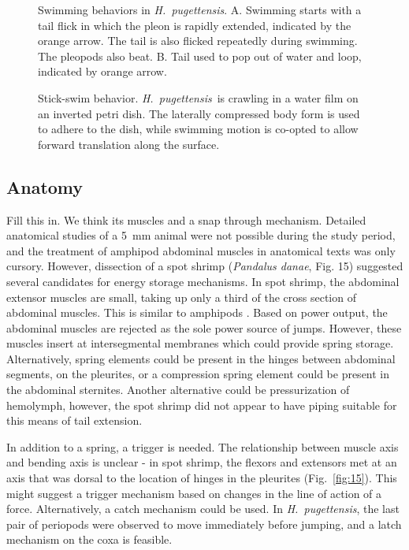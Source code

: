 \documentclass{article}
\newcommand{\Genus}[1]{\emph{#1}}
\newcommand{\Hyale}{\Genus{H.~pugettensis}}
\begin{document}
\begin{figure}
\caption{Swimming behaviors in \Hyale.  A.  Swimming starts with a tail flick in which the pleon is rapidly extended, indicated by the orange arrow.  The tail is also flicked repeatedly during swimming.  The pleopods also beat.  B.  Tail used to pop out of water and loop, indicated by orange arrow.}
\label{fig:19}
\end{figure}

\begin{figure}
\caption{Stick-swim behavior.  \Hyale\ is crawling in a water film on an inverted petri dish.  The laterally compressed body form is used to adhere to the dish, while swimming motion is co-opted to allow forward translation along the surface. }
\label{fig:20}
\end{figure}


\subsection*{Anatomy}
Fill this in.  We think its muscles and a snap through mechanism. Detailed anatomical studies of a \SI{5}{\milli\meter} animal were not possible during the study period, and the treatment of amphipod abdominal muscles in anatomical texts \citep{Schmitz:1991} was only cursory.  However, dissection of a spot shrimp (\Genus{Pandalus danae}, Fig. 15) suggested several candidates for energy storage mechanisms.  In spot shrimp, the abdominal extensor muscles are small, taking up only a third of the cross section of abdominal muscles.  This is similar to amphipods \citep{Schmitz:1991}.  Based on power output, the abdominal muscles are rejected as the sole power source of jumps.  However, these muscles insert at intersegmental membranes which could provide spring storage.  Alternatively, spring elements could be present in the hinges between abdominal segments, on the pleurites, or a compression spring element could be present in the abdominal sternites.  Another alternative could be pressurization of hemolymph, however, the spot shrimp did not appear to have piping suitable for this means of tail extension. 
	
In addition to a spring, a trigger is needed.  The relationship between muscle axis and bending axis is unclear - in spot shrimp, the flexors and extensors met at an axis that was dorsal to the location of hinges in the pleurites (Fig.~\ref{fig:15}).  This might suggest a trigger mechanism based on changes in the line of action of a force.  Alternatively, a catch mechanism could be used.  In \Hyale, the last pair of periopods were observed to move immediately before jumping, and a latch mechanism on the coxa is feasible.    
	
\end{document}
